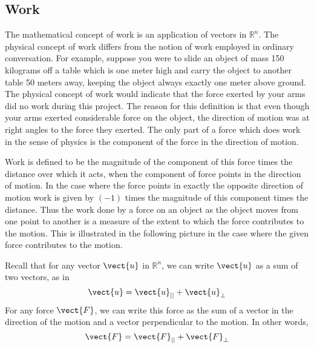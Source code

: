 \subsection{Work}

The mathematical concept of work is an application of vectors in $\mathbb{R}^n$.  The physical concept
of work differs from the notion of work employed in
ordinary conversation. For example, suppose you were to slide an object of mass 150 kilograms
off a table which is one meter high and carry the object to another table 50 meters away, keeping the object always exactly one meter above ground. The physical concept
of work would indicate that the force exerted by your arms did no work
during this project. The reason for this definition is that even
though your arms exerted considerable force on the object, the direction of motion was at right angles to the force they
exerted. The only part of a force which does work in the sense of physics is
the component of the force in the direction of motion.

Work is defined to be the magnitude of the component of
this force times the distance over which it acts, when the 
component of force points in the direction of motion. In the case where the force points in exactly the opposite direction of motion
work is given by $\left( -1\right) $
times the magnitude of this component times the distance.
Thus the work done by a force on an object as
the object moves from one point to another is a measure of the extent to
which the force contributes to the motion. This is illustrated in the
following picture in the case where the given force contributes to the
motion.

\begin{center}
\end{center}

Recall that for any vector $\vect{u}$ in $\mathbb{R}^n$, we can write $\vect{u}$ as a sum
of two vectors, as in
\begin{equation*}
\vect{u} = \vect{u}_{||} + \vect{u}_{\perp}
\end{equation*}
For any force $\vect{F}$,  
we can write this force as the sum of a vector in the direction of the motion and a vector
perpendicular to the motion. In other words,
\begin{equation*}
\vect{F} = \vect{F}_{||} + \vect{F}_{\bot}
\end{equation*}

